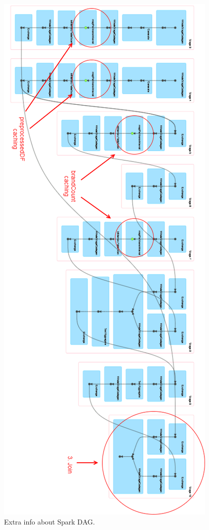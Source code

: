 \begin{figure}[H]
	\centering
	\includegraphics[scale=0.8]{images/3-spark/spark-DAG-info.png}
	\caption{Extra info about Spark DAG.}
	\label{fig:spark-DAG-info}
\end{figure}

